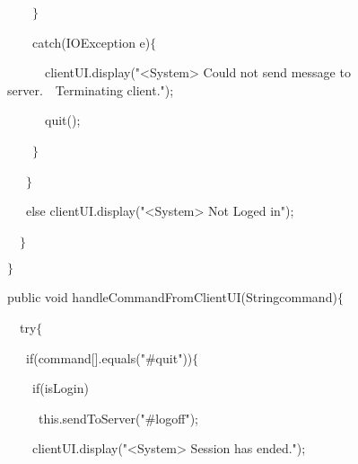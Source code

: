 {{\hlstd }{\hlstd\ \ \ \ }{\hlstd }{\hlsym $\}$}\leavevmode\par
{\hlstd \leavevmode\par
}{\hlstd\ \ \ \ }{\hlstd }{\hlkwa catch}{\hlstd }{\hlsym (}{\hlstd }{\hlkwc IOException }{\hlstd e}{\hlsym )$\{$}\leavevmode\par
{\hlstd }{\hlstd\ \ \ \ \ \ }{\hlstd clientUI}{\hlsym .}{\hlstd }{\hlkwd display}{\hlstd }{\hlsym (}{\hlstd }{\hlstr "$\mathord{<}$System$\mathord{>}$ Could not send message to server.}{\hlstd\ \ }{\hlstr Terminating client."}{\hlstd }{\hlsym );}\leavevmode\par
{\hlstd }{\hlstd\ \ \ \ \ \ }{\hlstd }{\hlkwd quit}{\hlstd }{\hlsym ();}\leavevmode\par
{\hlstd }{\hlstd\ \ \ \ }{\hlstd }{\hlsym $\}$}\leavevmode\par
{\hlstd }{\hlstd\ \ \ }{\hlstd }{\hlsym $\}$}\leavevmode\par
{\hlstd }{\hlstd\ \ \ }{\hlstd }{\hlkwa else }{\hlstd clientUI}{\hlsym .}{\hlstd }{\hlkwd display}{\hlstd }{\hlsym (}{\hlstd }{\hlstr "$\mathord{<}$System$\mathord{>}$ Not Loged in"}{\hlstd }{\hlsym );}\leavevmode\par
{\hlstd }{\hlstd\ \ }{\hlstd }{\hlsym $\}$}\leavevmode\par
{\hlstd 	}{\hlsym $\}$}\leavevmode\par
{\hlstd \leavevmode\par
	}{\hlkwa public }{\hlstd }{\hlkwb void }{\hlstd }{\hlkwd handleCommandFromClientUI}{\hlstd }{\hlsym (}{\hlstd }{\hlkwc String}{\hlstd }{\hlsym [] }{\hlstd command}{\hlsym )$\{$}\leavevmode\par
{\hlstd }{\hlstd\ \ }{\hlstd }{\hlkwa try}{\hlstd }{\hlsym $\{$}\leavevmode\par
{\hlstd }{\hlstd\ \ \ }{\hlstd }{\hlkwa if}{\hlstd }{\hlsym (}{\hlstd command}{\hlsym [}{\hlstd }{}{\hlstd }{\hlsym ].}{\hlstd }{\hlkwd equals}{\hlstd }{\hlsym (}{\hlstd }{\hlstr "\#quit"}{\hlstd }{\hlsym ))$\{$}\leavevmode\par
{\hlstd }{\hlstd\ \ \ \ }{\hlstd }{\hlkwa if}{\hlstd }{\hlsym (}{\hlstd isLogin}{\hlsym )}\leavevmode\par
{\hlstd }{\hlstd\ \ \ \ \ }{\hlstd }{\hlkwa this}{\hlstd }{\hlsym .}{\hlstd }{\hlkwd sendToServer}{\hlstd }{\hlsym (}{\hlstd }{\hlstr "\#logoff"}{\hlstd }{\hlsym );}\leavevmode\par
{\hlstd }{\hlstd\ \ \ \ }{\hlstd clientUI}{\hlsym .}{\hlstd }{\hlkwd display}{\hlstd }{\hlsym (}{\hlstd }{\hlstr "$\mathord{<}$System$\mathord{>}$ Session has ended."}{\hlstd }{\hlsym );}\leavevmode\par
}
